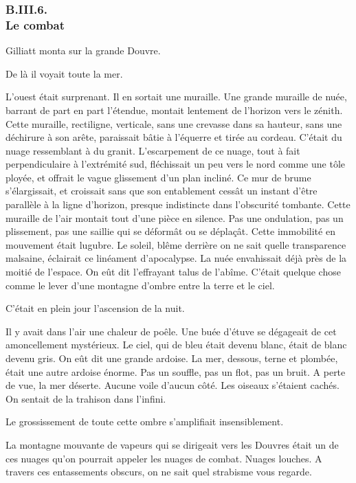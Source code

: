 \documentclass[french,twoside]{book} %
\begin{document}
 \subsubsection[{B.III.6. Le combat}]{B.III.6. \\
Le combat}
\noindent Gilliatt monta sur la grande Douvre.\par
De là il voyait toute la mer.\par
L’ouest était surprenant. Il en sortait une muraille. Une grande muraille de nuée, barrant de part en part l’étendue, montait lentement de l’horizon vers le zénith. Cette muraille, rectiligne, verticale, sans une crevasse dans sa hauteur, sans une déchirure à son arête, paraissait bâtie à l’équerre et tirée au cordeau. C’était du nuage ressemblant à du granit. L’escarpement de ce nuage, tout à fait perpendiculaire à l’extrémité sud, fléchissait un peu vers le nord comme une tôle ployée, et offrait le vague glissement d’un plan incliné. Ce mur de brume s’élargissait, et croissait sans que son entablement cessât un instant d’être parallèle à la ligne d’horizon, presque indistincte dans l’obscurité tombante. Cette muraille de l’air montait tout d’une pièce en silence. Pas une ondulation, pas un plissement, pas une saillie qui se déformât ou se déplaçât. Cette  immobilité en mouvement était lugubre. Le soleil, blême derrière on ne sait quelle transparence malsaine, éclairait ce linéament d’apocalypse. La nuée envahissait déjà près de la moitié de l’espace. On eût dit l’effrayant talus de l’abîme. C’était quelque chose comme le lever d’une montagne d’ombre entre la terre et le ciel.\par
C’était en plein jour l’ascension de la nuit.\par
Il y avait dans l’air une chaleur de poêle. Une buée d’étuve se dégageait de cet amoncellement mystérieux. Le ciel, qui de bleu était devenu blanc, était de blanc devenu gris. On eût dit une grande ardoise. La mer, dessous, terne et plombée, était une autre ardoise énorme. Pas un souffle, pas un flot, pas un bruit. A perte de vue, la mer déserte. Aucune voile d’aucun côté. Les oiseaux s’étaient cachés. On sentait de la trahison dans l’infini.\par
Le grossissement de toute cette ombre s’amplifiait insensiblement.\par
La montagne mouvante de vapeurs qui se dirigeait vers les Douvres était un de ces nuages qu’on pourrait appeler les nuages de combat. Nuages louches. A travers ces entassements obscurs, on ne sait quel strabisme vous regarde.\par
\end{document}
